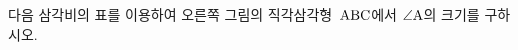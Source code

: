 \noindent\begin{minipage}[t]{0.58\linewidth}\vspace{0pt}\raggedright 다음 삼각비의 표를 이용하여 오른쪽 그림의 직각삼각형~$\mathrm{ABC}$에서 $\angle\mathrm{A}$의 크기를 구하시오.\end{minipage}\hfill\begin{minipage}[t]{0.4\linewidth}\vspace{0pt}\centering \resizebox{\ifdim\width>\linewidth\linewidth\else\width\fi}{!}{}\end{minipage}\par
\par\smallskip\begin{center}\resizebox{\ifdim\width>\linewidth\linewidth\else\width\fi}{!}{}\end{center}
